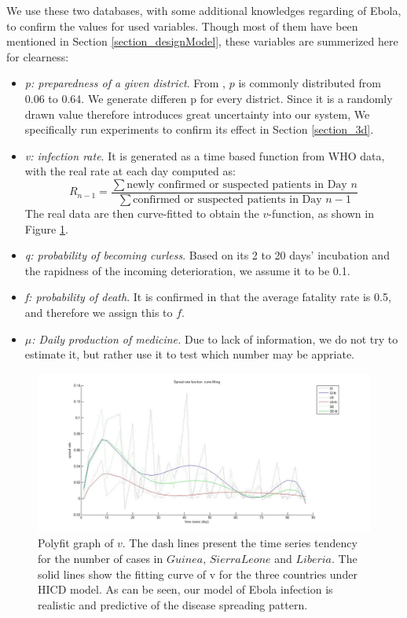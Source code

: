 \documentclass[12pt,a4paper,titlepage]{article}
\begin{document}
We use these two databases, with some additional knowledges regarding of Ebola, to confirm the values for used variables. Though most of them have been mentioned in Section \ref{section_designModel}, these variables are summerized here for clearness:
\begin{itemize}
    \item \emph{p: preparedness of a given district}. From \cite{WMADatabase20140204}, $p$ is commonly distributed from 0.06 to 0.64. We generate differen p for every district. Since it is a randomly drawn value therefore introduces great uncertainty into our system, We specifically run experiments to confirm its effect in Section \ref{section_3d}.
    \item \emph{v: infection rate}. It is generated as a time based function from WHO data, with the real rate at each day computed as: 
    \begin{equation*}
        R_{n-1} = \frac{\sum \text{newly confirmed or suspected patients in Day $n$}}{\sum \text{confirmed or suspected patients in Day $n-1$}}
    \end{equation*}
    The real data are then curve-fitted to obtain the $v$-function, as shown in Figure \ref{img_vfit}.
    \item \emph{q: probability of becoming curless}. Based on its 2 to 20 days' incubation and the rapidness of the incoming deterioration, we assume it to be 0.1.
    \item \emph{f: probability of death}. It is confirmed in \cite{ebolaInfo20140204} that the average fatality rate is 0.5, and therefore we assign this to $f$.
    \item \emph{$\mu$: Daily production of medicine. }Due to lack of information, we do not try to estimate it, but rather use it to test which number may be appriate.
\end{itemize}


\begin{figure}[htbp]
\centering
\includegraphics[width=1\textwidth]{figures/imgVfit.jpg}
\caption{\label{vgraph}Polyfit graph of $v$. The dash lines present the time series tendency for the number of cases in $Guinea$, $Sierra Leone$ and $Liberia$. The solid lines show the fitting curve of v for the three countries under HICD model. As can be seen, our model of Ebola infection is realistic and predictive of the disease spreading pattern.}
\label{img_vfit}
\end{figure}
\end{document}

